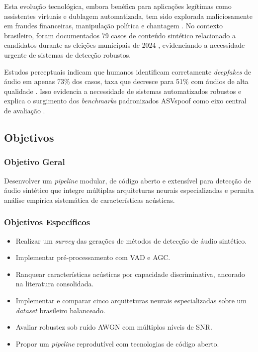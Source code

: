 \documentclass[12pt,a4paper]{article}
\begin{document}
Esta evolu\c{c}\~{a}o tecnol\'{o}gica, embora ben\'{e}fica para aplica\c{c}\~{o}es
leg\'{i}timas como assistentes virtuais e dublagem automatizada, tem sido
explorada maliciosamente em fraudes financeiras, manipula\c{c}\~{a}o pol\'{i}tica
e chantagem \cite{pindrop2025, dfrlab2024}.
No contexto brasileiro, foram documentados 79 casos de conte\'{u}do sint\'{e}tico
relacionado a candidatos durante as elei\c{c}\~{o}es municipais de 2024
\cite{farrugia2024}, evidenciando a necessidade urgente de sistemas de
detec\c{c}\~{a}o robustos.

Estudos perceptuais indicam que humanos identificam corretamente
\textit{deepfakes} de \'{a}udio em apenas 73\% dos casos, taxa que decresce
para 51\% com \'{a}udios de alta qualidade \cite{muller2022warning}.
Isso evidencia a necessidade de sistemas automatizados robustos e explica o
surgimento dos \textit{benchmarks} padronizados ASVspoof como eixo central de
avalia\c{c}\~{a}o \cite{todisco2019asvspoof, yamagishi2021asvspoof,
wang2024asvspoof5}.

\subsection{Objetivos}

\subsubsection{Objetivo Geral}
Desenvolver um \textit{pipeline} modular, de c\'{o}digo aberto e extens\'{i}vel
para detec\c{c}\~{a}o de \'{a}udio sint\'{e}tico que integre m\'{u}ltiplas
arquiteturas neurais especializadas e permita an\'{a}lise emp\'{i}rica
sistem\'{a}tica de caracter\'{i}sticas ac\'{u}sticas.

\subsubsection{Objetivos Espec\'{i}ficos}
\begin{itemize}
    \item Realizar um \textit{survey} das gera\c{c}\~{o}es de m\'{e}todos de
    detec\c{c}\~{a}o de \'{a}udio sint\'{e}tico.
    \item Implementar pr\'{e}-processamento com VAD e AGC.
    \item Ranquear caracter\'{i}sticas ac\'{u}sticas por capacidade
    discriminativa, ancorado na literatura consolidada.
    \item Implementar e comparar cinco arquiteturas neurais especializadas
    sobre um \textit{dataset} brasileiro balanceado.
    \item Avaliar robustez sob ru\'{i}do AWGN com m\'{u}ltiplos n\'{i}veis
    de SNR.
    \item Propor um \textit{pipeline} reprodut\'{i}vel com tecnologias de
    c\'{o}digo aberto.
\end{itemize}
\end{document}
